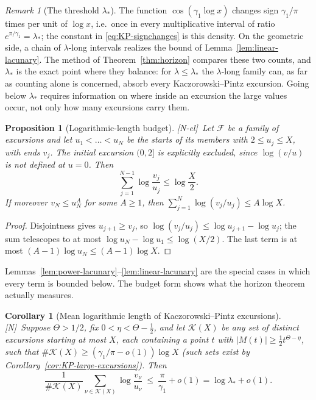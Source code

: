 \documentclass[11pt]{amsart}
\numberwithin{equation}{section}
\theoremstyle{plain}
\newtheorem{proposition}[theorem]{Proposition}
\newtheorem{corollary}[theorem]{Corollary}
\theoremstyle{definition}
\theoremstyle{remark}
\newtheorem{remark}[theorem]{Remark}
\newcommand{\F}{\mathcal{F}}
\newcommand{\tagN}{\textup{[N]}}
\newcommand{\tagNE}{\textup{[N-el]}}
\begin{document}
\begin{remark}[The threshold $\lambda_*$]
\label{rem:lambda-star}
The function $\cos(\gamma_1\log x)$ changes sign $\gamma_1/\pi$ times per
unit of $\log x$, i.e.\ once in every multiplicative interval of ratio
$e^{\pi/\gamma_1}=\lambda_*$; the constant in \eqref{eq:KP-signchanges} is
this density. On the geometric side, a chain of $\lambda$-long intervals
realizes the bound of Lemma~\ref{lem:linear-lacunary}. The method of
Theorem~\ref{thm:horizon} compares these two counts, and $\lambda_*$ is the
exact point where they balance: for $\lambda\le\lambda_*$ the $\lambda$-long
family can, as far as counting alone is concerned, absorb every
Kaczorowski--Pintz excursion. Going below $\lambda_*$ requires information
on where inside an excursion the large values occur, not only how many
excursions carry them.
\end{remark}

\begin{proposition}[Logarithmic-length budget]
\label{prop:log-budget}
\tagNE\ Let $\F$ be a family of excursions and let $u_1<\dots<u_N$ be the starts of
its members with $2\le u_j\le X$, with ends $v_j$.  The initial excursion
$(0,2]$ is explicitly excluded, since $\log(v/u)$ is not defined at
$u=0$.  Then
\[
\sum_{j=1}^{N-1}\log\frac{v_j}{u_j}\le\log\frac X2 .
\]
If moreover $v_N\le u_N^A$ for some $A\ge1$, then
$\sum_{j=1}^{N}\log(v_j/u_j)\le A\log X$.
\end{proposition}

\begin{proof}
Disjointness gives $u_{j+1}\ge v_j$, so
$\log(v_j/u_j)\le\log u_{j+1}-\log u_j$; the sum telescopes to at most
$\log u_N-\log u_1\le\log(X/2)$. The last term is at most
$(A-1)\log u_N\le(A-1)\log X$.
\end{proof}

Lemmas~\ref{lem:power-lacunary}--\ref{lem:linear-lacunary} are the special
cases in which every term is bounded below. The budget form shows what the
horizon theorem actually measures.

\begin{corollary}[Mean logarithmic length of Kaczorowski--Pintz excursions]
\label{cor:KP-mean-log-length}
\tagN\ Suppose $\Theta>1/2$, fix $0<\eta<\Theta-\frac12$, and let $\mathcal K(X)$
be any set of distinct excursions starting at most $X$, each containing a
point $t$ with $|M(t)|\ge\frac12t^{\Theta-\eta}$, such that
$\#\mathcal K(X)\ge(\gamma_1/\pi-o(1))\log X$ (such sets exist by
Corollary~\ref{cor:KP-large-excursions}). Then
\[
\frac1{\#\mathcal K(X)}\sum_{\nu\in\mathcal K(X)}\log\frac{v_\nu}{u_\nu}
\ \le\ \frac{\pi}{\gamma_1}+o(1)=\log\lambda_*+o(1).
\]
\end{corollary}
\end{document}
